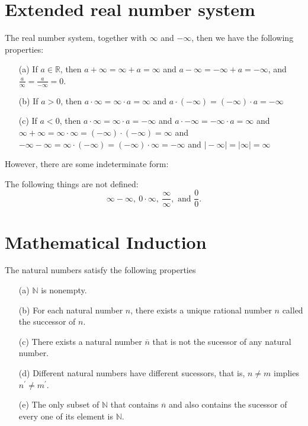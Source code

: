 \section{Extended real number system}
The real number system, together with \(\infty \) and \(-\infty \), then we have the following properties: 
\begin{itemize}
    \item [(a)] If \(a \in \mathbb{R} \), then \(a + \infty = \infty + a = \infty \) and \(a - \infty = -\infty + a = -\infty \), and \(\frac{a}{\infty }=\frac{a}{-\infty } = 0\). 
    \item [(b)] If \(a > 0\), then \(a \cdot \infty  = \infty \cdot a = \infty \) and \(a \cdot (-\infty ) = (-\infty ) \cdot a = -\infty \)
    \item [(c)] If \(a<0\), then \(a \cdot \infty = \infty \cdot a = -\infty \) and \(a \cdot -\infty = -\infty \cdot a = \infty \) and \(\infty +\infty = \infty \cdot \infty  = (-\infty ) \cdot (-\infty )=\infty \) and \(-\infty  - \infty  = \infty \cdot (-\infty ) = (-\infty ) \cdot \infty = -\infty \)  and \(\vert -\infty  \vert = \vert \infty  \vert = \infty \) 
\end{itemize}  
However, there are some indeterminate form: 
\begin{theorem}
    The following things are not defined:
    \[
        \infty - \infty, \ 0 \cdot \infty, \ \frac{\infty}{\infty }, \text{ and } \frac{0}{0}.
    \]
\end{theorem}

\section{Mathematical Induction}
\begin{theorem}\label{thm: Peano's postulate}
    The natural numbers satisfy the following properties 
    \begin{itemize}
        \item [(a)] \(\mathbb{N} \) is nonempty. 
        \item [(b)] For each natural number \(n\), there exists a unique rational number \(n\) called the successor of \(n\). 
        \item [(c)] There exists a natural number \(\overline{n} \) that is not the sucessor of any natural number.   
        \item [(d)] Different natural numbers have different sucessors, that is, \(n \neq m\) implies \(n^{\prime} \neq m^{\prime} \). 
        \item [(e)] The only subset of \(\mathbb{N} \) that contains \(\overline{n}\) and also contains the sucessor of every one of its element is \(\mathbb{N} \).       
    \end{itemize}
\end{theorem}

